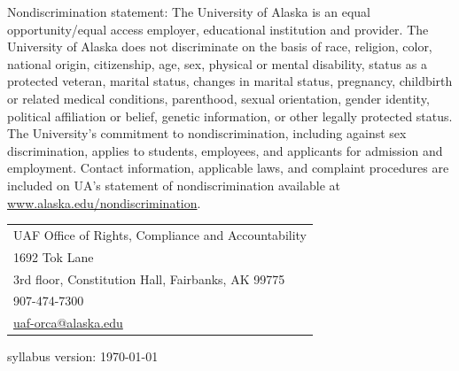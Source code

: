 \documentclass[12pt]{article}
\begin{document}
Nondiscrimination statement: The University of Alaska is an equal opportunity/equal access employer, educational institution and provider. The University of Alaska does not discriminate on the basis of race, religion, color, national origin, citizenship, age, sex, physical or mental disability, status as a protected veteran, marital status, changes in marital status, pregnancy, childbirth or related medical conditions, parenthood, sexual orientation, gender identity, political affiliation or belief, genetic information, or other legally protected status. The University's commitment to nondiscrimination, including against sex discrimination, applies to students, employees, and applicants for admission and employment. Contact information, applicable laws, and complaint procedures are included on UA's statement of nondiscrimination available at \url{www.alaska.edu/nondiscrimination}.

\begin{tabular}{l}
UAF Office of Rights, Compliance and Accountability\\
1692 Tok Lane\\
3rd floor, Constitution Hall, Fairbanks, AK 99775\\
907-474-7300\\
\url{uaf-orca@alaska.edu}
\end{tabular}


 \scriptsize syllabus version: \today \normalsize
\end{document}
